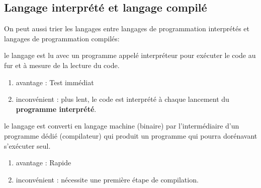 \subsection{Langage interprété et langage compilé}		
On peut aussi trier les langages entre langages de programmation interprétés  et langages de programmation compilés:
\begin{enumerate}
	 le langage est lu avec un programme appelé interpréteur pour exécuter le code au fur et à mesure de la lecture du code.  \\
	\begin{enumerate}
		\item{avantage :} Test immédiat 
		\item{inconvénient :} plus lent, le code est interprété à chaque lancement du \textbf{programme interprété}.
	\end{enumerate}
	 le langage est converti en langage machine (binaire) par l'intermédiaire d'un programme dédié (compilateur) qui produit un programme qui pourra dorénavant s'exécuter seul.\\
	\begin{enumerate}
		\item{avantage :} Rapide
		\item{inconvénient :} nécessite une première étape de compilation.
	\end{enumerate}
\end{enumerate}

